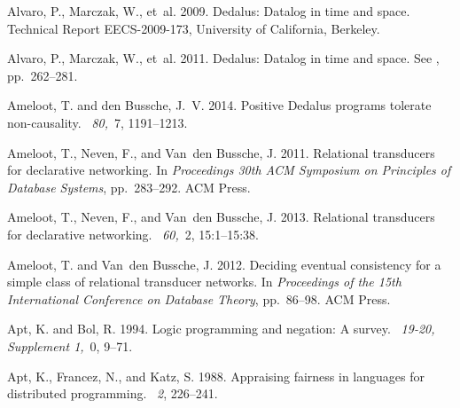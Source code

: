 \documentclass{tlp}
\begin{document}
\begin{thebibliography}{}
{\sc Alvaro, P.}, {\sc Marczak, W.}, {\sc et~al.} 2009.
\newblock Dedalus: {D}atalog in time and space.
\newblock Technical Report EECS-2009-173, University of California, Berkeley.

{\sc Alvaro, P.}, {\sc Marczak, W.}, {\sc et~al.} 2011.
\newblock Dedalus: {D}atalog in time and space.
\newblock See , pp.\  262--281.

{\sc Ameloot, T.} {\sc and} {\sc den Bussche, J.~V.} 2014.
\newblock Positive {D}edalus programs tolerate non-causality.
~{\em 80,\/}~7,
  1191--1213.

{\sc Ameloot, T.}, {\sc Neven, F.}, {\sc and} {\sc Van~den Bussche, J.} 2011.
\newblock Relational transducers for declarative networking.
\newblock In {\em Proceedings 30th ACM Symposium on Principles of Database
  Systems}, pp.\  283--292. ACM Press.

{\sc Ameloot, T.}, {\sc Neven, F.}, {\sc and} {\sc Van~den Bussche, J.} 2013.
\newblock Relational transducers for declarative networking.
~{\em 60,\/}~2, 15:1--15:38.

{\sc Ameloot, T.} {\sc and} {\sc Van~den Bussche, J.} 2012.
\newblock Deciding eventual consistency for a simple class of relational
  transducer networks.
\newblock In {\em Proceedings of the 15th International Conference on Database
  Theory}, pp.\  86--98. ACM Press.

{\sc Apt, K.} {\sc and} {\sc Bol, R.} 1994.
\newblock Logic programming and negation: A survey.
~{\em 19-20, Supplement
  1,\/}~0, 9--71.

{\sc Apt, K.}, {\sc Francez, N.}, {\sc and} {\sc Katz, S.} 1988.
\newblock Appraising fairness in languages for distributed programming.
~{\em 2}, 226--241.


\end{thebibliography}
\end{document}
